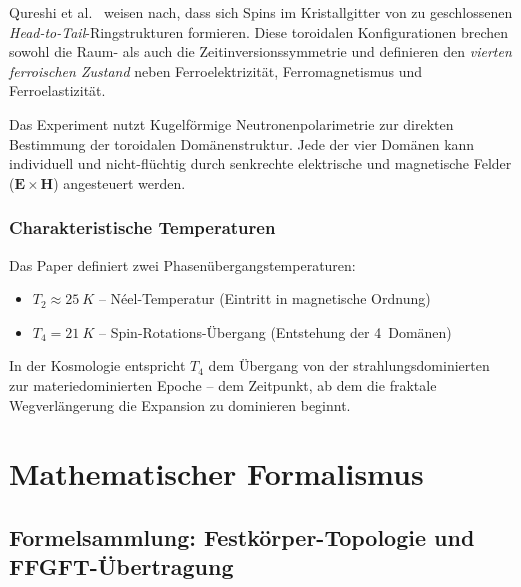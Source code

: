 Qureshi et al.~\cite{Qureshi2026} weisen nach, dass sich Spins im Kristallgitter
von  zu geschlossenen \emph{Head-to-Tail}-Ringstrukturen
formieren. Diese toroidalen Konfigurationen brechen sowohl die Raum- als auch
die Zeitinversionssymmetrie und definieren den \emph{vierten ferroischen Zustand}
neben Ferroelektrizität, Ferromagnetismus und Ferroelastizität.

\begin{experimental}
Das Experiment nutzt Kugelförmige Neutronenpolarimetrie zur direkten Bestimmung
der toroidalen Domänenstruktur. Jede der vier Domänen kann individuell und
nicht-flüchtig durch senkrechte elektrische und magnetische Felder
($\mathbf{E} \times \mathbf{H}$) angesteuert werden.
\end{experimental}

\section{Charakteristische Temperaturen}

Das Paper definiert zwei Phasenübergangstemperaturen:
\begin{itemize}
  \item $T_2 \approx \SI{25}{K}$ -- Néel-Temperatur (Eintritt in magnetische Ordnung)
  \item $T_4 = \SI{21}{K}$ -- Spin-Rotations-Übergang (Entstehung der 4~Domänen)
\end{itemize}

\begin{interpretation}
In der Kosmologie entspricht $T_4$ dem Übergang von der strahlungsdominierten
zur materiedominierten Epoche -- dem Zeitpunkt, ab dem die fraktale
Wegverlängerung die Expansion zu dominieren beginnt.
\end{interpretation}

\part{Mathematischer Formalismus}

\chapter{Formelsammlung: Festkörper-Topologie und FFGFT-Übertragung}

